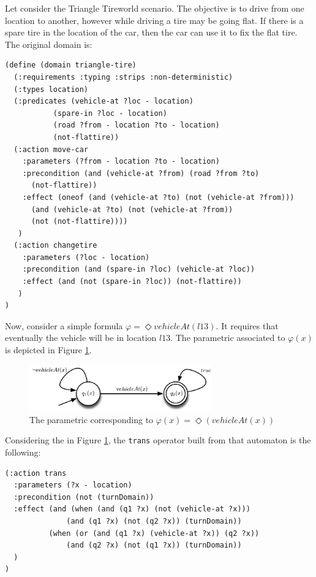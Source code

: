 \begin{example}\label{ex:new-dom}
Let consider the Triangle Tireworld scenario. The objective is to drive from one location to another, however while driving a tire may be going flat. If there is a spare tire in the location of the car, then the car can use it to fix the flat tire. The original \PDDL domain is:
\begin{lstlisting}[language=PDDL, escapechar=£]
(define (domain triangle-tire)
  (:requirements :typing :strips :non-deterministic)
  (:types location)
  (:predicates (vehicle-at ?loc - location)
	       (spare-in ?loc - location)
	       (road ?from - location ?to - location)
	       (not-flattire))
  (:action move-car
    :parameters (?from - location ?to - location)
    :precondition (and (vehicle-at ?from) (road ?from ?to) 
      (not-flattire))
    :effect (oneof (and (vehicle-at ?to) (not (vehicle-at ?from)))
	  (and (vehicle-at ?to) (not (vehicle-at ?from)) 
	  (not (not-flattire))))
   )
  (:action changetire
    :parameters (?loc - location)
    :precondition (and (spare-in ?loc) (vehicle-at ?loc))
    :effect (and (not (spare-in ?loc)) (not-flattire))
   )
)
\end{lstlisting}
Now, consider a simple \LTLf formula $\varphi = \Diamond vehicleAt(l13)$. It requires that eventually the vehicle will be in location $l13$. The parametric \DFA associated to $\varphi(x)$ is depicted in Figure \ref{fig:dfa-parametric2}.
\begin{figure}[h]
\centering
\includegraphics[width=0.7\textwidth]{images/automa-param2}
\caption{The parametric \DFA corresponding to $\varphi(x) = \Diamond(vehicleAt(x))$} 
\label{fig:dfa-parametric2}
\end{figure}

Considering the \DFA in Figure \ref{fig:dfa-parametric2}, the \texttt{trans} operator built from that automaton is the following:
\begin{lstlisting}[language=PDDL, escapechar=£]
(:action trans
  :parameters (?x - location)
  :precondition (not (turnDomain))
  :effect (and (when (and (q1 ?x) (not (vehicle-at ?x)))
              (and (q1 ?x) (not (q2 ?x)) (turnDomain))
          (when (or (and (q1 ?x) (vehicle-at ?x)) (q2 ?x))
              (and (q2 ?x) (not (q1 ?x)) (turnDomain))
  )
)
\end{lstlisting}


\end{example}
